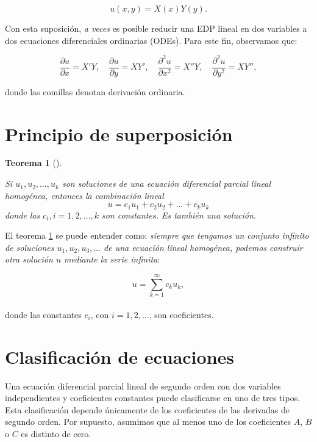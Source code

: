 \documentclass[
  spanish,
  us-letterpaper,
]{scrreprt}
\theoremstyle{plain}
\newtheorem{theorem}{Teorema}[chapter]
\theoremstyle{definition}
\theoremstyle{remark}
\begin{document}
\[
u(x, y) = X(x)Y(y).
\]

Con esta suposición, \emph{a veces} es posible reducir una EDP lineal en
dos variables a dos ecuaciones diferenciales ordinarias (ODEs). Para
este fin, observamos que:

\[
\dfrac{\partial u}{\partial x} = X'Y, \quad
\dfrac{\partial u}{\partial y} = XY', \quad
\dfrac{\partial^2 u}{\partial x^2} = X''Y, \quad
\dfrac{\partial^2 u}{\partial y^2} = XY'',
\]

donde las comillas denotan derivación ordinaria.

\section{Principio de
superposición}\label{principio-de-superposiciuxf3n}

\begin{theorem}[]\protect\hypertarget{thm-superposition}{}\label{thm-superposition}

Si \(u_1 , u_2 , \dots , u_k\) son soluciones de una ecuación
diferencial parcial lineal homogénea, entonces la combinación lineal \[
u = c_1u_1 + c_2u_2 + \dots + c_ku_k
\] donde las \(c_i, i=1,2,\dots,k\) son constantes. Es también una
solución.

\end{theorem}

El teorema \ref{thm-superposition} se puede entender como: \emph{siempre
que tengamos un conjunto infinito de soluciones
\(u_1, u_2, u_3, \ldots\) de una ecuación lineal homogénea, podemos
construir otra solución \(u\) mediante la serie infinita}:

\[  
u = \sum_{k=1}^{\infty} c_k u_k,  
\]\\
donde las constantes \(c_i\), con \(i = 1, 2, \ldots\), son
coeficientes.

\section{Clasificación de
ecuaciones}\label{clasificaciuxf3n-de-ecuaciones}

Una ecuación diferencial parcial lineal de segundo orden con dos
variables independientes y coeficientes constantes puede clasificarse en
uno de tres tipos. Esta clasificación depende únicamente de los
coeficientes de las derivadas de segundo orden. Por supuesto, asumimos
que al menos uno de los coeficientes \(A\), \(B\) o \(C\) es distinto de
cero.
\end{document}
